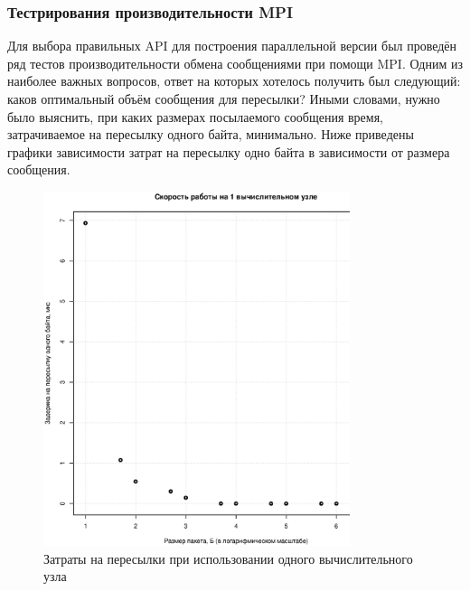 \subsubsection{Тестрирования производительности MPI}
Для выбора правильных API для построения параллельной версии был проведён ряд тестов производительности обмена сообщениями при помощи MPI. Одним из наиболее важных вопросов, ответ на которых хотелось получить был следующий: каков оптимальный объём сообщения для пересылки? Иными словами, нужно было выяснить, при каких размерах посылаемого сообщения время, затрачиваемое на пересылку одного байта, минимально.
Ниже приведены графики зависимости затрат на пересылку одно байта в зависимости от размера сообщения.
\begin{figure}[htp]
\centering
\includegraphics[width=0.8\textwidth]{eps/mpi-1host.eps}
\caption{Затраты на пересылки при использовании одного вычислительного
 узла}
\label{pic:mpi1host}
\end{figure}
